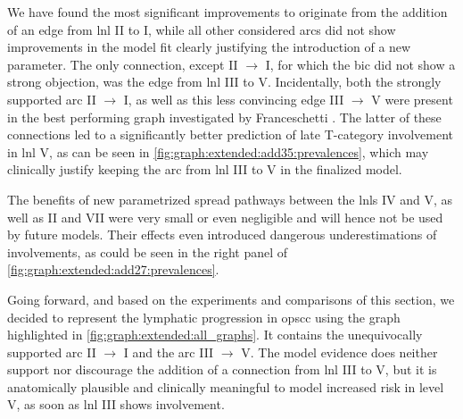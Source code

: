 \documentclass[\relativeRoot/main.tex]{subfiles}
\begin{document}
We have found the most significant improvements to originate from the addition of an edge from \gls{lnl} II to I, while all other considered arcs did not show improvements in the model fit clearly justifying the introduction of a new parameter. The only connection, except II $\rightarrow$ I, for which the \gls{bic} did not show a strong objection, was the edge from \gls{lnl} III to V. Incidentally, both the strongly supported arc II $\rightarrow$ I, as well as this less convincing edge III $\rightarrow$ V were present in the best performing graph investigated by Franceschetti \cite{franceschetti_comparison_2022}. The latter of these connections led to a significantly better prediction of late T-category involvement in \gls{lnl} V, as can be seen in \cref{fig:graph:extended:add35:prevalences}, which may clinically justify keeping the arc from \gls{lnl} III to V in the finalized model.

The benefits of new parametrized spread pathways between the \glspl{lnl} IV and V, as well as II and VII were very small or even negligible and will hence not be used by future models. Their effects even introduced dangerous underestimations of involvements, as could be seen in the right panel of \cref{fig:graph:extended:add27:prevalences}.

Going forward, and based on the experiments and comparisons of this section, we decided to represent the lymphatic progression in \gls{opscc} using the graph highlighted in \cref{fig:graph:extended:all_graphs}. It contains the unequivocally supported arc II $\rightarrow$ I and the arc III $\rightarrow$ V. The model evidence does neither support nor discourage the addition of a connection from \gls{lnl} III to V, but it is anatomically plausible and clinically meaningful to model increased risk in level V, as soon as \gls{lnl} III shows involvement.
\end{document}
